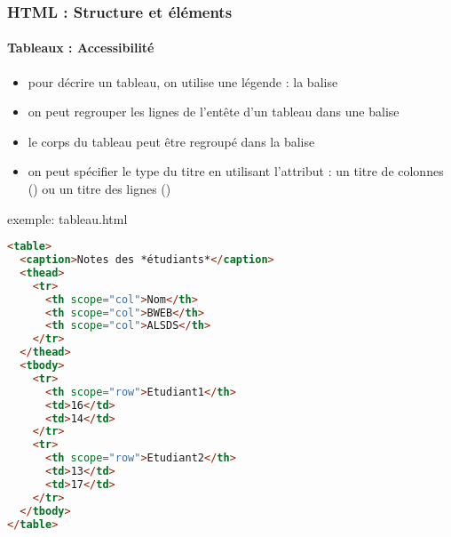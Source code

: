 \documentclass[xcolor=table]{beamer}
\begin{document}
\begin{frame}[fragile]
\frametitle{HTML : Structure et éléments}
\framesubtitle{Tableaux : Accessibilité}

\begin{minipage}{0.50\textwidth} 
	\begin{itemize}
		\item pour décrire un tableau, on utilise une légende : la balise 
		\item on peut regrouper les lignes de l'entête d'un tableau dans une balise 
		\item le corps du tableau peut être regroupé dans la balise 
		\item on peut spécifier le type du titre en utilisant l'attribut  : un titre de colonnes () ou un titre des lignes ()
	\end{itemize}
\end{minipage}
%
\begin{minipage}{0.49\textwidth}
\begin{exampleblock}{exemple: tableau.html}
\lstset{escapeinside=**}
\tiny\bfseries\vspace{-6pt}
\begin{lstlisting}[language={html}]
<table>
  <caption>Notes des *étudiants*</caption>
  <thead>
    <tr>
      <th scope="col">Nom</th>
      <th scope="col">BWEB</th>
      <th scope="col">ALSDS</th>
    </tr>
  </thead>
  <tbody>
    <tr>
      <th scope="row">Etudiant1</th>
      <td>16</td>
      <td>14</td>
    </tr>
    <tr>
      <th scope="row">Etudiant2</th>
      <td>13</td>
      <td>17</td>
    </tr>
  </tbody>
</table>
\end{lstlisting}\vspace{-6pt}
\end{exampleblock}
\end{minipage}

\end{frame}
\end{document}
